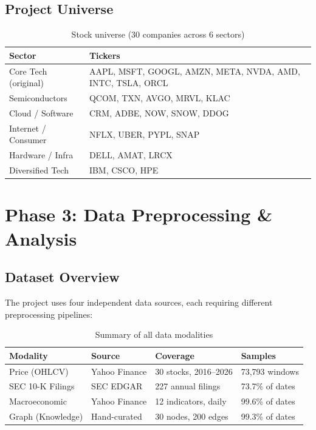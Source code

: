 \documentclass[12pt,a4paper]{article}
\begin{document}
\subsection{Project Universe}

\begin{table}[H]
\centering
\caption{Stock universe (30 companies across 6 sectors)}
\begin{tabular}{ll}
\toprule
\textbf{Sector} & \textbf{Tickers} \\
\midrule
Core Tech (original)    & AAPL, MSFT, GOOGL, AMZN, META, NVDA, AMD, INTC, TSLA, ORCL \\
Semiconductors          & QCOM, TXN, AVGO, MRVL, KLAC \\
Cloud / Software        & CRM, ADBE, NOW, SNOW, DDOG \\
Internet / Consumer     & NFLX, UBER, PYPL, SNAP \\
Hardware / Infra        & DELL, AMAT, LRCX \\
Diversified Tech        & IBM, CSCO, HPE \\
\bottomrule
\end{tabular}
\end{table}

\section{Phase 3: Data Preprocessing \& Analysis}
\subsection{Dataset Overview}

The project uses four independent data sources, each requiring different preprocessing pipelines:

\begin{table}[H]
\centering
\caption{Summary of all data modalities}
\begin{tabular}{llll}
\toprule
\textbf{Modality} & \textbf{Source} & \textbf{Coverage} & \textbf{Samples} \\
\midrule
Price (OHLCV)       & Yahoo Finance    & 30 stocks, 2016--2026 & 73,793 windows \\
SEC 10-K Filings    & SEC EDGAR        & 227 annual filings    & 73.7\% of dates \\
Macroeconomic       & Yahoo Finance    & 12 indicators, daily  & 99.6\% of dates \\
Graph (Knowledge)   & Hand-curated     & 30 nodes, 200 edges   & 99.3\% of dates \\
\bottomrule
\end{tabular}
\end{table}
\end{document}
